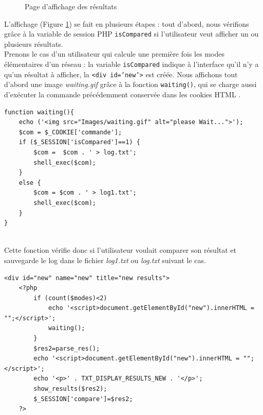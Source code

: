 \begin{figure}[!ht]
	\begin{center}
		\caption{Page d'affichage des résultats}
  		\label{Results}
  	\end{center}	
\end{figure}

L'affichage (Figure \ref{Results}) se fait en plusieurs étapes : tout d'abord, nous vérifions grâce à la variable de session PHP \texttt{isCompared} si l'utilisateur veut afficher un ou plusieurs résultats.\\

Prenons le cas d'un utilisateur qui calcule une première fois les modes élémentaires d'un réseau : la variable \texttt{isCompared} indique à l'interface qu'il n'y a qu'un résultat à afficher, la \texttt{<div id='new'>} est créée. Nous affichons tout d'abord une image \emph{waiting.gif} grâce à la fonction \texttt{waiting()}, qui se charge aussi d'exécuter la commande précédemment conservée dans les cookies HTML .\\

\begin{DDbox}{\linewidth}
\begin{lstlisting}
function waiting(){
	echo ('<img src="Images/waiting.gif" alt="please Wait...">');
	$com = $_COOKIE['commande'];
	if ($_SESSION['isCompared']==1) {
		$com =  $com . ' > log.txt';
		shell_exec($com);
	}
	else {
		$com = $com . ' > log1.txt';
		shell_exec($com);
	}
}
\end{lstlisting}
\end{DDbox}\\

Cette fonction vérifie donc si l'utilisateur voulait comparer son résultat et sauvegarde le log dans le fichier \emph{log1.txt} ou \emph{log.txt} suivant le cas.\\

\begin{DDbox}{\linewidth}
\begin{lstlisting}
<div id="new" name="new" title="new results">
	<?php
		if (count($modes)<2)
			echo '<script>document.getElementById("new").innerHTML = "";</script>';
			waiting();
		}
		$res2=parse_res();
		echo '<script>document.getElementById("new").innerHTML = "";</script>';
		echo '<p>' . TXT_DISPLAY_RESULTS_NEW . '</p>';
		show_results($res2);
		$_SESSION['compare']=$res2;
	?>		
\end{lstlisting}
\end{DDbox}

